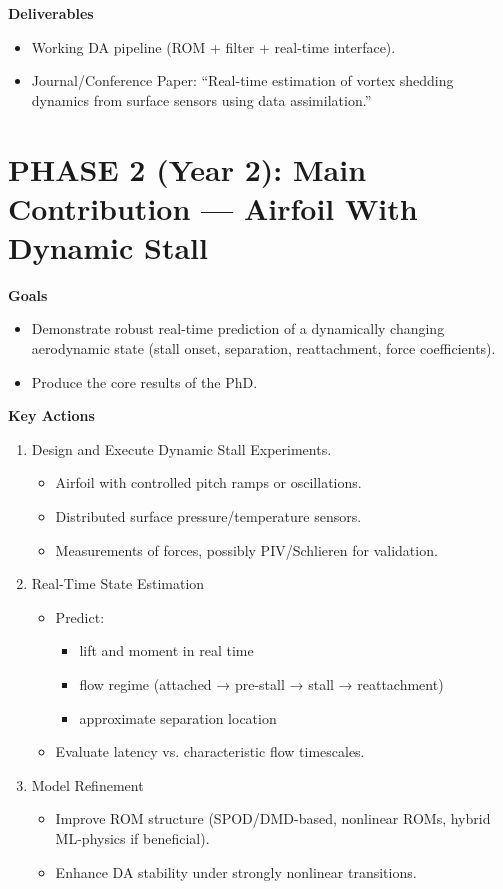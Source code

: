 \documentclass[12pt,a4paper]{article}
\begin{document}
\textbf{Deliverables}

\begin{itemize}
    \item Working DA pipeline (ROM + filter + real-time interface).
    \item Journal/Conference Paper: “Real-time estimation of vortex shedding dynamics from surface sensors using data assimilation.”
\end{itemize}

\section{PHASE 2 (Year 2): Main Contribution — Airfoil With Dynamic Stall}

\textbf{Goals}

\begin{itemize}
    \item Demonstrate robust real-time prediction of a dynamically changing aerodynamic state (stall onset, separation, reattachment, force coefficients).
    \item Produce the core results of the PhD.
\end{itemize}

\textbf{Key Actions}

\begin{enumerate}
    \item Design and Execute Dynamic Stall Experiments.
    \begin{itemize}
        \item Airfoil with controlled pitch ramps or oscillations.
        \item Distributed surface pressure/temperature sensors.
        \item Measurements of forces, possibly PIV/Schlieren for validation.
    \end{itemize}
    \item Real-Time State Estimation
    \begin{itemize}
        \item Predict:
        \begin{itemize}
            \item lift and moment in real time
            \item flow regime (attached → pre-stall → stall → reattachment)
            \item approximate separation location
        \end{itemize}
        \item  Evaluate latency vs. characteristic flow timescales.
    \end{itemize}
    \item Model Refinement
    \begin{itemize}
        \item Improve ROM structure (SPOD/DMD-based, nonlinear ROMs, hybrid ML-physics if beneficial).
        \item Enhance DA stability under strongly nonlinear transitions.
    \end{itemize}
\end{enumerate}
\end{document}
